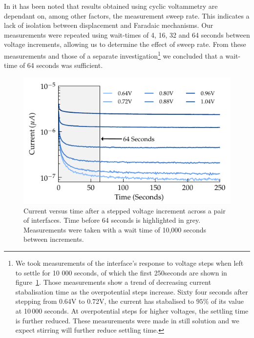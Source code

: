 \documentclass[journal, a4paper]{IEEEtran}
\begin{document}
{In \cite{Cogan2008} it has been noted that results obtained using cyclic voltammetry are dependant on, among other factors, the measurement sweep rate. This indicates a lack of isolation between displacement and Faradaic mechanisms. Our measurements were repeated using wait-times of 4, 16, 32 and 64 seconds between voltage increments, allowing us to determine the effect of sweep rate. From these measurements and those of a separate investigation\footnote{We took measurements of the interface's response to voltage steps when left to settle for 10 000 seconds, of which the first 250\thinspace seconds are shown in figure~\ref{fig:CPE_currentVsTime}. Those measurements show a trend of decreasing current stabalisation time as the overpotential steps increase. Sixty four seconds after stepping from 0.64\thinspace V to 0.72\thinspace V, the current has stabalised to $95\%$ of its value at 10\,000 seconds. At overpotential steps for higher voltages, the settling time is further reduced. These measurements were made in still solution and we expect stirring will further reduce settling time.} we concluded that a wait-time of 64 seconds was sufficient.
\begin{figure}
    \begin{center}
        \includegraphics{graphics/CPE_currentVsTime}
    \end{center}
    \caption{Current versus time after a stepped voltage increment across a pair of interfaces. Time before 64 seconds is highlighted in grey. Measurements were taken with a wait time of 10,000 seconds between increments.}
    \label{fig:CPE_currentVsTime}
\end{figure}

}
\end{document}
